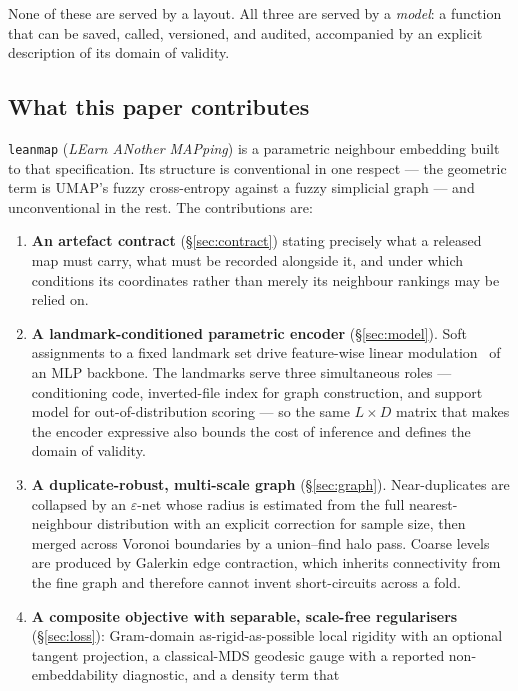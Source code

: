 \documentclass[12pt]{iopart}
\theoremstyle{definition}
\theoremstyle{plain}
\theoremstyle{remark}
\newcommand{\code}[1]{\texttt{#1}}
\begin{document}
None of these are served by a layout. All three are served by a \emph{model}:
a function that can be saved, called, versioned, and audited, accompanied by an
explicit description of its domain of validity.

\subsection{What this paper contributes}

\code{leanmap} (\emph{LEarn ANother MAPping}) is a parametric neighbour
embedding built to that specification. Its structure is conventional in one
respect --- the geometric term is UMAP's fuzzy cross-entropy against a fuzzy
simplicial graph --- and unconventional in the rest. The contributions are:

\begin{enumerate}[leftmargin=*]
\item \textbf{An artefact contract} (\S\ref{sec:contract}) stating precisely
  what a released map must carry, what must be recorded alongside it, and under
  which conditions its coordinates rather than merely its neighbour rankings
  may be relied on.
\item \textbf{A landmark-conditioned parametric encoder} (\S\ref{sec:model}).
  Soft assignments to a fixed landmark set drive feature-wise linear
  modulation~\cite{perez2018film} of an MLP backbone. The landmarks serve three
  simultaneous roles --- conditioning code, inverted-file index for graph
  construction, and support model for out-of-distribution scoring --- so the
  same $L\times D$ matrix that makes the encoder expressive also bounds the
  cost of inference and defines the domain of validity.
\item \textbf{A duplicate-robust, multi-scale graph} (\S\ref{sec:graph}).
  Near-duplicates are collapsed by an $\varepsilon$-net whose radius is
  estimated from the full nearest-neighbour distribution with an explicit
  correction for sample size, then merged across Voronoi boundaries by a
  union--find halo pass. Coarse levels are produced by Galerkin edge
  contraction, which inherits connectivity from the fine graph and therefore
  cannot invent short-circuits across a fold.
\item \textbf{A composite objective with separable, scale-free
  regularisers} (\S\ref{sec:loss}): Gram-domain as-rigid-as-possible local
  rigidity with an optional tangent projection, a classical-MDS geodesic gauge
  with a reported non-embeddability diagnostic, and a density term that

\end{enumerate}
\end{document}
